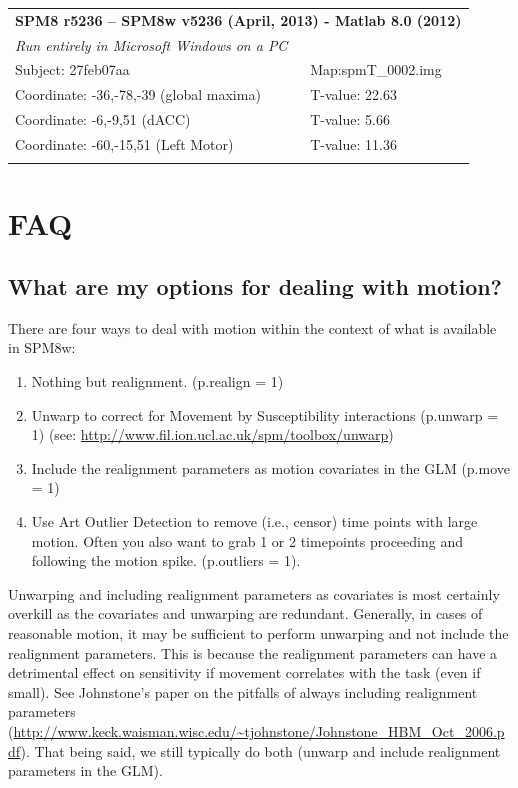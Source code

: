 \documentclass[12pt]{article}
\begin{document}
\begin{center}
\begin{tabular}{ll}
	\hline
	\multicolumn{2}{l}{\textbf{SPM8 r5236 -- SPM8w v5236 (April, 2013) - Matlab 8.0 (2012)}}\\
	\multicolumn{2}{l}{\textit{Run entirely in Microsoft Windows on a PC}}\\
	\hline
	Subject: 27feb07aa & Map:spmT\_0002.img \\
	\hline
	Coordinate: -36,-78,-39 (global maxima) & T-value: 22.63\\
	Coordinate: -6,-9,51 (dACC) & T-value: 5.66\\
	Coordinate: -60,-15,51 (Left Motor) & T-value: 11.36\\
	\hline \\
\end{tabular}

\end{center}
 
\newpage

\section{FAQ}
\secttoc %
\subsection{What are my options for dealing with motion?}
There are four ways to deal with motion within the context of what is available in SPM8w:
\begin{enumerate}
	\item Nothing but realignment. (p.realign = 1)
	\item Unwarp to correct for Movement by Susceptibility interactions (p.unwarp = 1) \newline(see: \url{http://www.fil.ion.ucl.ac.uk/spm/toolbox/unwarp})
	\item Include the realignment parameters as motion covariates in the GLM (p.move = 1)
	\item Use Art Outlier Detection to remove (i.e., censor) time points with large motion. Often you also want to grab 1 or 2 timepoints proceeding and following the motion spike. (p.outliers = 1).
\end{enumerate}
Unwarping and including realignment parameters as covariates is most certainly overkill as the covariates and unwarping are redundant. Generally, in cases of reasonable motion, it may be sufficient to perform unwarping and not include the realignment parameters. This is because the realignment parameters can have a detrimental effect on sensitivity if movement correlates with the task (even if small). See Johnstone's paper on the pitfalls of always including realignment parameters (\url{http://www.keck.waisman.wisc.edu/~tjohnstone/Johnstone_HBM_Oct_2006.pdf}). That being said, we still typically do both (unwarp and include realignment parameters in the GLM). 
\end{document}
